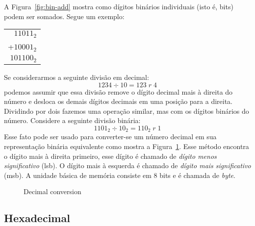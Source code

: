 A Figura~\ref{fig:bin-add} mostra como dígitos binários individuais (isto é, 
bits) podem ser somados. Segue um exemplo:

\begin{tabular}{r}
 $11011_2$ \\
+$10001_2$ \\
\hline
$101100_2$ \\
\end{tabular}

Se considerarmos a seguinte divisão em decimal:
\[ 1234 \div 10 = 123\; r\; 4 \]
podemos assumir que essa divisão remove o dígito decimal mais à direita do 
número e desloca os demais dígitos decimais em uma posição para a direita. 
Dividindo por dois fazemos uma operação similar, mas com os dígitos binários do 
número. Considere a seguinte divisão binária:
\[ 1101_2 \div 10_2 = 110_2\; r\; 1 \]
Esse fato pode ser usado para converter-se um número decimal em sua 
representação binária equivalente como mostra a Figura~\ref{fig:dec-convert}. 
Esse método encontra o dígito mais à direita primeiro, esse dígito é chamado de 
\emph{dígito menos significativo} (lsb). O dígito mais à esquerda é chamado de 
\emph{dígito mais significativo} (msb). A unidade básica de memória consiste em 
8 bits e é chamada de \emph{byte}.

\begin{figure}[t]
\centering
{}
\caption{Decimal conversion \label{fig:dec-convert}}
\end{figure}

\subsection{Hexadecimal}

